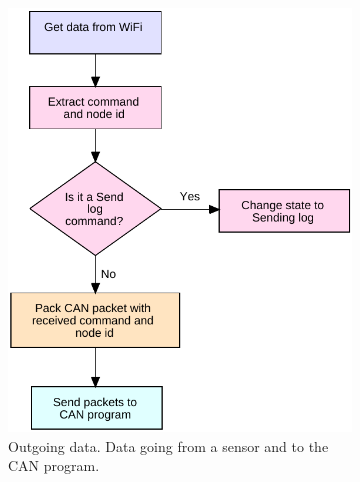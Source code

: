 \begin{figure}[!h]
    \centering
    \begin{subfigure}{0.42\textwidth}
    \centering
        \includegraphics[width=1\textwidth]{graphics/FlowChart_NodeWiFiCmd}
        \caption{Outgoing data. Data going from a sensor and to the CAN program.}
        \label{fig:filter_1}
    \end{subfigure}
    ~
    \begin{subfigure}{0.52\textwidth}
    \centering

\end{subfigure}
\end{figure}
